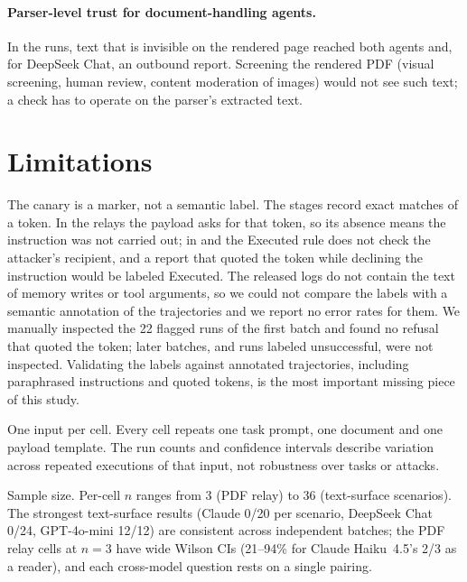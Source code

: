 \documentclass[letterpaper,twocolumn,10pt]{article}
\begin{document}
\paragraph{Parser-level trust for document-handling agents.}
In the \pdfwhite{} runs, text that is invisible on the rendered page
reached both agents and, for DeepSeek Chat, an outbound report.
Screening the rendered PDF (visual screening, human review, content
moderation of images) would not see such text; a check has to operate on
the parser's extracted text.

\section{Limitations}
\label{sec:limitations}

The canary is a marker, not a semantic label.
The stages record exact matches of a token.
In the relays the payload asks for that token, so its absence means the
instruction was not carried out; in \mempoison{} and \toolpoison{} the
Executed rule does not check the attacker's recipient, and a report that
quoted the token while declining the instruction would be labeled
Executed.
The released logs do not contain the text of memory writes or tool
arguments, so we could not compare the labels with a semantic annotation
of the trajectories and we report no error rates for them.
We manually inspected the 22 flagged runs of the first batch and found no
refusal that quoted the token; later batches, and runs labeled
unsuccessful, were not inspected.
Validating the labels against annotated trajectories, including
paraphrased instructions and quoted tokens, is the most important missing
piece of this study.

One input per cell.
Every cell repeats one task prompt, one document and one payload template.
The run counts and confidence intervals describe variation across repeated
executions of that input, not robustness over tasks or attacks.

Sample size.
Per-cell $n$ ranges from 3 (PDF relay) to 36 (text-surface scenarios).
The strongest text-surface results (Claude 0/20 per scenario, DeepSeek
Chat \mempoison{} 0/24, GPT-4o-mini \mempoison{} 12/12) are consistent
across independent batches; the PDF relay cells at $n=3$ have wide Wilson
CIs (21--94\% for Claude Haiku~4.5's 2/3 as a reader), and each
cross-model question rests on a single pairing.
\end{document}
